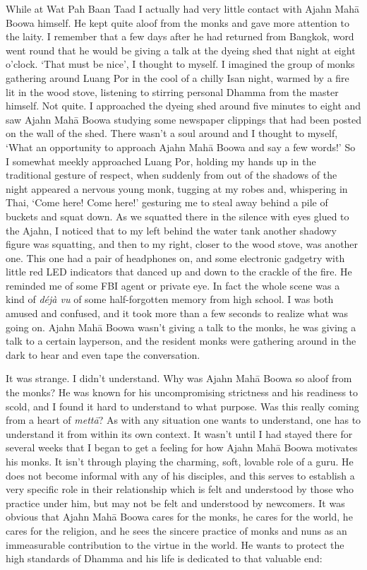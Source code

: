 While at Wat Pah Baan Taad I actually had very little contact with Ajahn
Mahā Boowa himself. He kept quite aloof from the monks and gave more
attention to the laity. I remember that a few days after he had returned
from Bangkok, word went round that he would be giving a talk at the
dyeing shed that night at eight o'clock. `That must be nice', I thought
to myself. I imagined the group of monks gathering around Luang Por
in the cool of a chilly Isan night, warmed by a fire lit in the wood
stove, listening to stirring personal Dhamma from the master himself. 
Not quite. I approached the dyeing shed around five minutes to eight and
saw Ajahn Mahā Boowa studying some newspaper clippings that had been
posted on the wall of the shed. There wasn't a soul around and I thought
to myself, `What an opportunity to approach Ajahn Mahā Boowa and say a
few words!' So I somewhat meekly approached Luang Por, holding my hands
up in the traditional gesture of respect, when suddenly from out of the
shadows of the night appeared a nervous young monk, tugging at my robes
and, whispering in Thai, `Come here! Come here!' gesturing me to steal
away behind a pile of buckets and squat down. As we squatted there in
the silence with eyes glued to the Ajahn, I noticed that to my left
behind the water tank another shadowy figure was squatting, and then to
my right, closer to the wood stove, was another one. This one had a pair
of headphones on, and some electronic gadgetry with little red LED
indicators that danced up and down to the crackle of the fire. He
reminded me of some FBI agent or private eye. In fact the whole scene
was a kind of \emph{déjà vu} of some half-forgotten memory from high
school. I was both amused and confused, and it took more than a few
seconds to realize what was going on. Ajahn Mahā Boowa wasn't giving a
talk to the monks, he was giving a talk to a certain layperson, and the
resident monks were gathering around in the dark to hear and even tape
the conversation. 

It was strange. I didn't understand. Why was Ajahn Mahā Boowa so aloof
from the monks? He was known for his uncompromising strictness and his
readiness to scold, and I found it hard to understand to what purpose. 
Was this really coming from a heart of \emph{mettā}? As with any
situation one wants to understand, one has to understand it from within
its own context. It wasn't until I had stayed there for several weeks
that I began to get a feeling for how Ajahn Mahā Boowa motivates his
monks. It isn't through playing the charming, soft, lovable role of a
guru. He does not become informal with any of his disciples, and this
serves to establish a very specific role in their relationship which is
felt and understood by those who practice under him, but may not be felt
and understood by newcomers. It was obvious that Ajahn Mahā Boowa cares
for the monks, he cares for the world, he cares for the religion, and he
sees the sincere practice of monks and nuns as an immeasurable
contribution to the virtue in the world. He wants to protect the high
standards of Dhamma and his life is dedicated to that valuable end: 

